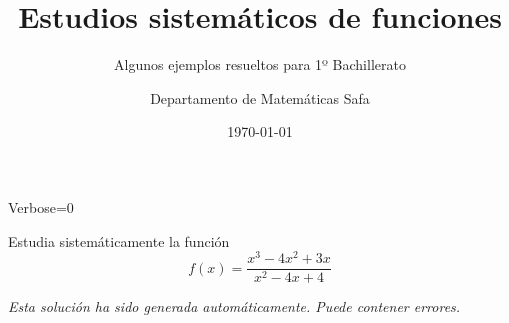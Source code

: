 \documentclass[nochap,palatino,nobuilddate]{estudioFuncion}
\title{Estudios sistemáticos de funciones}
\author{Departamento de Matemáticas Safa}
\date{\today}
\subtitle{Algunos ejemplos resueltos para 1º Bachillerato}
\newif\ifverbose
\begin{document}

\ifverbose
	\begin{sagesilent}
		Verbose=1
	\end{sagesilent}
\else
	\begin{sagesilent}
		Verbose=0
	\end{sagesilent}
\fi


\maketitle




\begin{problem} Estudia sistemáticamente la función
	\[
		f(x)=\frac{x^3-4x^2+3x}{x^2-4x+4}
	\]
\solution

\textit{Esta solución ha sido generada automáticamente. Puede contener errores.}


\end{problem}
















\end{document}
